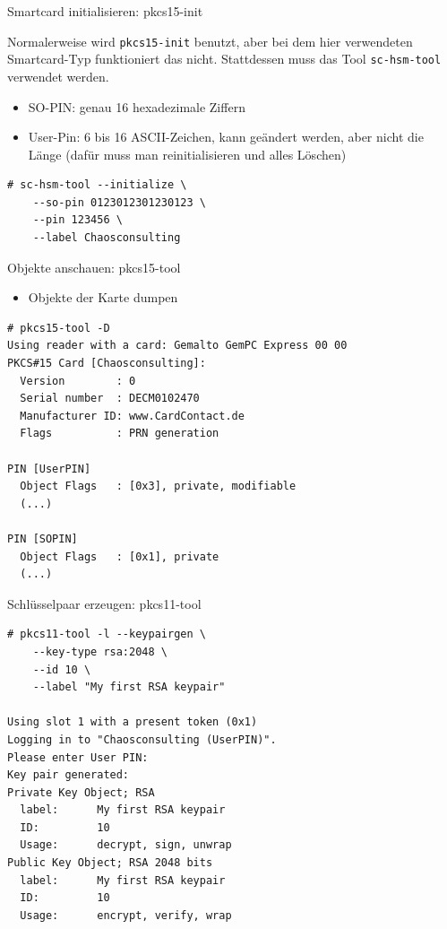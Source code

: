 \documentclass{beamer}
\begin{document}
\begin{frame}[fragile]{Smartcard initialisieren: pkcs15-init}
\begin{minipage}[t][\textheight][t]{\linewidth}
Normalerweise wird \lstinline|pkcs15-init| benutzt, aber bei dem hier
verwendeten Smartcard-Typ funktioniert das nicht. Stattdessen muss das Tool
\lstinline|sc-hsm-tool| verwendet werden.
\begin{itemize}
  \item SO-PIN: genau 16 hexadezimale Ziffern
  \item User-Pin: 6 bis 16 ASCII-Zeichen, kann
geändert werden, aber nicht die Länge  (dafür muss man reinitialisieren und
alles Löschen)
\end{itemize}
\begin{lstlisting}
# sc-hsm-tool --initialize \
    --so-pin 0123012301230123 \
    --pin 123456 \
    --label Chaosconsulting
\end{lstlisting}
\end{minipage}
\end{frame}

\begin{frame}[fragile]{Objekte anschauen: pkcs15-tool}
\begin{minipage}[t][\textheight][t]{\linewidth}
\begin{itemize}
  \item Objekte der Karte dumpen
\end{itemize}
\begin{lstlisting}
# pkcs15-tool -D
Using reader with a card: Gemalto GemPC Express 00 00
PKCS#15 Card [Chaosconsulting]:
  Version        : 0
  Serial number  : DECM0102470
  Manufacturer ID: www.CardContact.de
  Flags          : PRN generation

PIN [UserPIN]
  Object Flags   : [0x3], private, modifiable
  (...)

PIN [SOPIN]
  Object Flags   : [0x1], private
  (...)
\end{lstlisting}
\end{minipage}
\end{frame}

\begin{frame}[fragile]{Schlüsselpaar erzeugen: pkcs11-tool}
\begin{minipage}[t][\textheight][t]{\linewidth}
\begin{lstlisting}
# pkcs11-tool -l --keypairgen \
    --key-type rsa:2048 \
    --id 10 \
    --label "My first RSA keypair"
    
Using slot 1 with a present token (0x1)
Logging in to "Chaosconsulting (UserPIN)".
Please enter User PIN: 
Key pair generated:
Private Key Object; RSA 
  label:      My first RSA keypair
  ID:         10
  Usage:      decrypt, sign, unwrap
Public Key Object; RSA 2048 bits
  label:      My first RSA keypair
  ID:         10
  Usage:      encrypt, verify, wrap

\end{lstlisting}
\end{minipage}
\end{frame}
\end{document}
